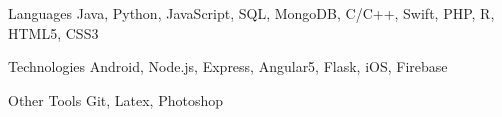 

\begin{cvskills}

  \cvskill
    {Languages} %
    {Java, Python, JavaScript, SQL, MongoDB, C/C++, Swift, PHP, R, HTML5, CSS3} %

  \cvskill
    {Technologies} %
    {Android, Node.js, Express, Angular5, Flask, iOS, Firebase} %

  \cvskill
    {Other Tools} %
    {Git, Latex, Photoshop} %

\end{cvskills}
